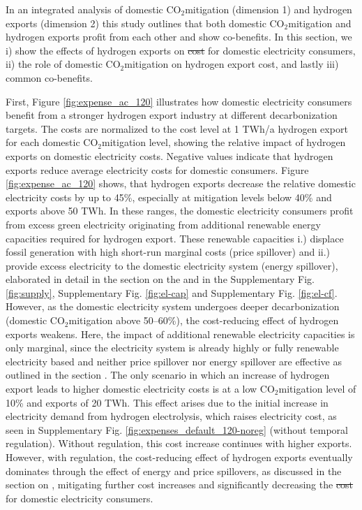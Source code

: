 \documentclass[5p,numafflabel]{elsarticle}
\newcommand{\co}{\ce{CO2}~}
\def\co{CO${}_2${\:}}
\providecommand{\DIFaddtex}[1]{{\protect\color{blue}\uwave{#1}}} %
\providecommand{\DIFdeltex}[1]{{\protect\color{red}\sout{#1}}}                      %
\providecommand{\DIFaddbegin}{} %
\providecommand{\DIFaddend}{} %
\providecommand{\DIFdelbegin}{} %
\providecommand{\DIFdelend}{} %
\providecommand{\DIFadd}[1]{\texorpdfstring{\DIFaddtex{#1}}{#1}} %
\providecommand{\DIFdel}[1]{\texorpdfstring{\DIFdeltex{#1}}{}} %
\newcommand{\DIFscaledelfig}{0.5}
\newlength{\DIFdelgraphicswidth} %
\newlength{\DIFdelgraphicsheight} %
\newcommand{\DIFaddincludegraphics}[2][]{{\color{blue}\fbox{\DIFOincludegraphics[#1]{#2}}}} %
\newcommand{\DIFdelincludegraphics}[2][]{%
\sbox{\DIFdelgraphicsbox}{\DIFOincludegraphics[#1]{#2}}%
\settoboxwidth{\DIFdelgraphicswidth}{\DIFdelgraphicsbox} %
\settoboxtotalheight{\DIFdelgraphicsheight}{\DIFdelgraphicsbox} %
\scalebox{\DIFscaledelfig}{%
\parbox[b]{\DIFdelgraphicswidth}{\usebox{\DIFdelgraphicsbox}\\[-\baselineskip] \rule{\DIFdelgraphicswidth}{0em}}\llap{\resizebox{\DIFdelgraphicswidth}{\DIFdelgraphicsheight}{%
\setlength{\unitlength}{\DIFdelgraphicswidth}%
\begin{picture}(1,1)%
\thicklines\linethickness{2pt} %
{\color[rgb]{1,0,0}\put(0,0){\framebox(1,1){}}}%
{\color[rgb]{1,0,0}\put(0,0){\line( 1,1){1}}}%
{\color[rgb]{1,0,0}\put(0,1){\line(1,-1){1}}}%
\end{picture}%
}\hspace*{3pt}}} %
} %
\DeclareRobustCommand{\DIFaddbegin}{\DIFOaddbegin \let\includegraphics\DIFaddincludegraphics} %
\DeclareRobustCommand{\DIFaddend}{\DIFOaddend \let\includegraphics\DIFOincludegraphics} %
\DeclareRobustCommand{\DIFdelbegin}{\DIFOdelbegin \let\includegraphics\DIFdelincludegraphics} %
\DeclareRobustCommand{\DIFdelend}{\DIFOaddend \let\includegraphics\DIFOincludegraphics} %
\begin{document}
In an integrated analysis of domestic \co mitigation (dimension 1) and hydrogen exports (dimension 2) this study outlines that both domestic \co mitigation and hydrogen exports profit from each other and show co-benefits. In this section, we i) show the effects of hydrogen exports on \DIFdelbegin \DIFdel{cost }\DIFdelend \DIFaddbegin \DIFadd{market-based costs }\DIFaddend for domestic electricity consumers, ii) the role of domestic \co mitigation on hydrogen export cost, and lastly iii) common co-benefits.

First, Figure \ref{fig:expense_ac_120} illustrates how domestic electricity consumers benefit from a stronger hydrogen export industry at different decarbonization targets. The costs are normalized to the cost level at 1 TWh/a hydrogen export for each domestic \co mitigation level, showing the relative impact of hydrogen exports on domestic electricity costs. Negative values indicate that hydrogen exports reduce average \DIFaddbegin \DIFadd{market-based }\DIFaddend electricity costs for domestic consumers.
Figure \ref{fig:expense_ac_120} shows, that hydrogen exports decrease the relative domestic electricity costs by up to 45\%, especially at mitigation levels below 40\% and exports above 50 TWh. 
In these ranges, the domestic electricity consumers profit from excess green electricity originating from additional renewable energy capacities required for hydrogen export. These renewable capacities i.) displace fossil generation with high short-run marginal costs (price spillover) and ii.) provide excess electricity to the domestic electricity system (energy spillover), elaborated in detail in the section on the  and in the Supplementary Fig. \ref{fig:supply}, Supplementary Fig. \ref{fig:el-cap} and Supplementary Fig. \ref{fig:el-cf}.
However, as the domestic electricity system undergoes deeper decarbonization (domestic \co mitigation above 50--60\%), the cost-reducing effect of hydrogen exports weakens. Here, the impact of additional renewable electricity capacities is only marginal, since the electricity system is already highly or fully renewable electricity based and neither price spillover nor energy spillover are effective as outlined in the section .
The only scenario in which an increase of hydrogen export leads to higher domestic electricity costs is at a low \co mitigation level of 10\% and exports of 20 TWh.
This effect arises due to the initial increase in electricity demand from hydrogen electrolysis, which raises electricity cost, as seen in Supplementary Fig. \ref{fig:expenses_default_120-noreg} (without temporal regulation). Without regulation, this cost increase continues with higher exports. However, with regulation, the cost-reducing effect of hydrogen exports eventually dominates through the effect of energy and price spillovers, as discussed in the section on , mitigating further cost increases and significantly decreasing the \DIFdelbegin \DIFdel{cost }\DIFdelend \DIFaddbegin \DIFadd{market-based costs }\DIFaddend for domestic electricity consumers.
\end{document}
